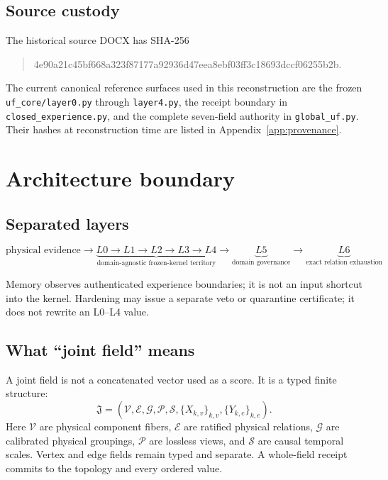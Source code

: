 \documentclass[11pt,oneside]{article}
\newcommand{\Vertices}{\mathcal{V}}
\newcommand{\Edges}{\mathcal{E}}
\newcommand{\Groups}{\mathcal{G}}
\newcommand{\Scales}{\mathcal{S}}
\newcommand{\Perspectives}{\mathcal{P}}
\begin{document}
\subsection{Source custody}

The historical source DOCX has SHA-256
\begin{quote}\ttfamily
4e90a21c45bf668a323f87177a92936d47eea8ebf03ff3c18693dccf06255b2b.
\end{quote}
The current canonical reference surfaces used in this reconstruction are the
frozen \texttt{uf\_core/layer0.py} through \texttt{layer4.py}, the receipt
boundary in \texttt{closed\_experience.py}, and the complete seven-field
authority in \texttt{global\_uf.py}. Their hashes at reconstruction time are
listed in Appendix~\ref{app:provenance}.

\section{Architecture boundary}

\subsection{Separated layers}

\[
\boxed{
  \text{physical evidence}
  \longrightarrow
  \underbrace{L0\longrightarrow L1\longrightarrow L2\longrightarrow
  L3\longrightarrow L4}_{\text{domain-agnostic frozen-kernel territory}}
  \longrightarrow
  \underbrace{L5}_{\text{domain governance}}
  \longrightarrow
  \underbrace{L6}_{\text{exact relation exhaustion}}
}
\]

Memory observes authenticated experience boundaries; it is not an input
shortcut into the kernel. Hardening may issue a separate veto or quarantine
certificate; it does not rewrite an L0--L4 value.

\subsection{What ``joint field'' means}

A joint field is not a concatenated vector used as a score. It is a typed
finite structure:
\[
  \mathfrak{J}
  =
  \left(
    \Vertices,\Edges,\Groups,\Perspectives,\Scales,
    \{X_{k,v}\}_{k,v},
    \{Y_{k,e}\}_{k,e}
  \right).
\]
Here \(\Vertices\) are physical component fibers, \(\Edges\) are ratified
physical relations, \(\Groups\) are calibrated physical groupings,
\(\Perspectives\) are lossless views, and \(\Scales\) are causal temporal
scales. Vertex and edge fields remain typed and separate. A whole-field
receipt commits to the topology and every ordered value.
\end{document}
